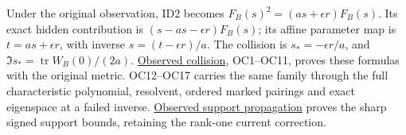 \documentclass[
]{article}
\begin{document}
Under the original observation, ID2 becomes
\(F_B(s)^2=(as+\epsilon r)F_B(s)\). Its exact hidden contribution is
\((s-as-\epsilon r)F_B(s)\); its affine parameter map is
\(t=as+\epsilon r\), with inverse \(s=(t-\epsilon r)/a\). The collision
is \(s_*=-\epsilon r/a\), and \(\Im s_*=\operatorname{tr}W_B(0)/(2a)\).
\href{https://github.com/KokunoYumeto/zeta-function-research-reader/blob/c9df443d9e1df000dfbb083943f97197e746eb08/workbenches/splitzero-tandem/branches/identity-absorber-square/OBSERVED_COLLISION.md}{Observed
collision}, OC1--OC11, proves these formulas with the original metric.
OC12--OC17 carries the same family through the full characteristic
polynomial, resolvent, ordered marked pairings and exact eigenspace at a
failed inverse.
\href{https://github.com/KokunoYumeto/zeta-function-research-reader/blob/c9df443d9e1df000dfbb083943f97197e746eb08/workbenches/splitzero-tandem/branches/identity-absorber-square/OBSERVED_SUPPORT_PROPAGATION.md}{Observed
support propagation} proves the sharp signed support bounds, retaining
the rank-one current correction.
\end{document}
